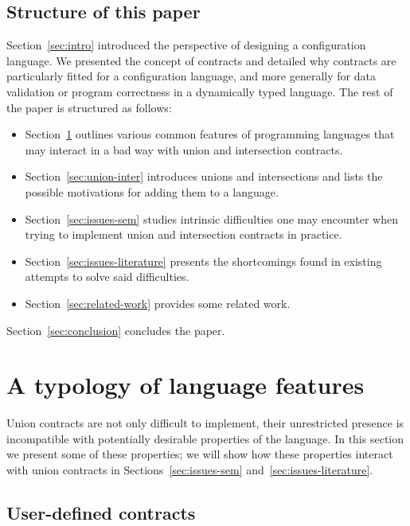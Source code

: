 \documentclass[sigplan,10pt,review,anonymous]{acmart}
\newcommand{\unsure}[2][1=]{}
\newcommand{\info}[2][1=]{}
\begin{document}
\subsection{Structure of this paper}
\unsure{Make this section into a contributions section?}
Section~\ref{sec:intro} introduced the perspective of designing a configuration
language. We presented the concept of contracts and detailed why contracts are
particularly fitted for a configuration language, and more generally for data
validation or program correctness in a dynamically typed language. The rest of
the paper is structured as follows:
\begin{itemize}
    \item Section~\ref{sec:feat-lang} outlines various common features of
        programming languages that may interact in a bad way with union and
        intersection contracts.
    \item Section~\ref{sec:union-inter} introduces unions and intersections and
        lists the possible motivations for adding them to a language.
    \item Section~\ref{sec:issues-sem} studies intrinsic difficulties one may
        encounter when trying to implement union and intersection contracts in
        practice.
    \item Section~\ref{sec:issues-literature} presents the shortcomings found in
        existing attempts to solve said difficulties.
    \item Section~\ref{sec:related-work} provides some related work.
\end{itemize}

Section~\ref{sec:conclusion} concludes the paper.


\section{A typology of language features}
\label{sec:feat-lang}
\info{Zoology of various features that we will eventually show
  conflict with this or that property or implementation of union and
  intersection. Including user-define contracts.}

Union contracts are not only difficult to implement, their
unrestricted presence is incompatible with potentially desirable
properties of the language. In this section we present some of these
properties; we will show how these properties interact with union
contracts in Sections~\ref{sec:issues-sem}
and~\ref{sec:issues-literature}.

\subsection{User-defined contracts}
\label{sec:flat-contracts}
\end{document}
